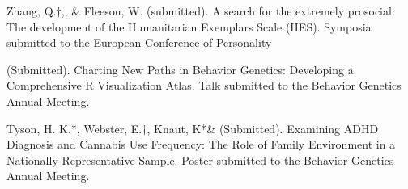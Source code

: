 

\item Zhang, Q.$\dagger$,\meb, \&  Fleeson, W. (submitted). A search for the extremely prosocial: The development of the Humanitarian Exemplars Scale (HES). Symposia submitted to the European Conference of Personality %

\item \meb (Submitted). Charting New Paths in Behavior Genetics: Developing a Comprehensive R Visualization Atlas. Talk submitted to the Behavior Genetics Annual Meeting.

\item Tyson, H. K.*, Webster, E.$\dagger$, Knaut, K*\& \meb (Submitted). Examining ADHD Diagnosis and Cannabis Use Frequency: The Role of Family Environment in a Nationally-Representative Sample. Poster submitted to the Behavior Genetics Annual Meeting.

%

%

%

%

